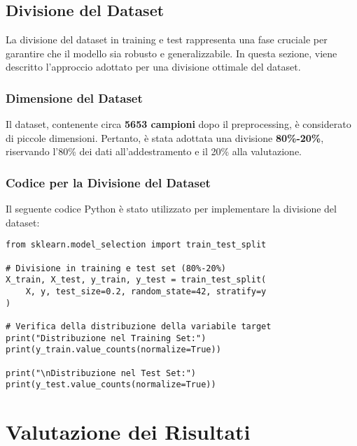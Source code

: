 \documentclass[a4paper,12pt]{article}
\begin{document}
\subsection{Divisione del Dataset}

La divisione del dataset in training e test rappresenta una fase cruciale per garantire che il modello sia robusto e generalizzabile. In questa sezione, viene descritto l'approccio adottato per una divisione ottimale del dataset.


\subsubsection{Dimensione del Dataset}
Il dataset, contenente circa \textbf{5653 campioni} dopo il preprocessing, è considerato di piccole dimensioni. Pertanto, è stata adottata una divisione \textbf{80\%-20\%}, riservando l'80\% dei dati all'addestramento e il 20\% alla valutazione.

\subsubsection{Codice per la Divisione del Dataset}
Il seguente codice Python è stato utilizzato per implementare la divisione del dataset:

\begin{verbatim}
from sklearn.model_selection import train_test_split

# Divisione in training e test set (80%-20%)
X_train, X_test, y_train, y_test = train_test_split(
    X, y, test_size=0.2, random_state=42, stratify=y
)

# Verifica della distribuzione della variabile target
print("Distribuzione nel Training Set:")
print(y_train.value_counts(normalize=True))

print("\nDistribuzione nel Test Set:")
print(y_test.value_counts(normalize=True))
\end{verbatim}

\section{Valutazione dei Risultati}
\end{document}
